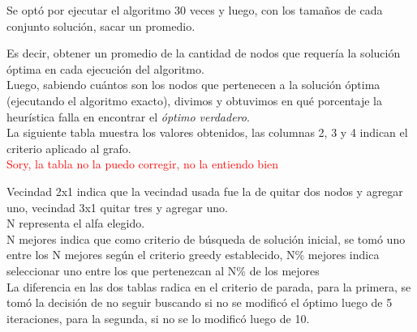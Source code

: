 \bigskip

Se opt\'o por ejecutar el algoritmo 30 veces y luego, con los tama\~nos de cada conjunto soluci\'on, sacar un promedio.

Es decir, obtener un promedio de la cantidad de nodos que requer\'ia la soluci\'on \'optima en cada ejecuci\'on del algoritmo.\\


Luego, sabiendo cu\'antos son los nodos que pertenecen a la soluci\'on \'optima (ejecutando el algoritmo exacto), divimos y obtuvimos en qu\'e porcentaje la heur\'istica falla en encontrar el \textit{\'optimo verdadero}.\\

La siguiente tabla muestra los valores obtenidos, las columnas 2, 3 y 4 indican el criterio aplicado al grafo.\\

\textcolor{red}{Sory, la tabla no la puedo corregir, no la entiendo bien}

Vecindad 2x1 indica que la vecindad usada fue la de quitar dos nodos y agregar uno, vecindad 3x1 quitar tres y agregar uno.\\

N representa el alfa elegido.\\

N mejores indica que como criterio de b\'usqueda de soluci\'on inicial, se tom\'o uno entre los N mejores seg\'un el criterio greedy establecido, N\% mejores indica seleccionar uno entre los que pertenezcan al N\% de los mejores\\

La diferencia en las dos tablas radica en el criterio de parada, para la primera, se tom\'o la decisi\'on de no seguir buscando si no se modific\'o el \'optimo luego de 5 iteraciones, para la segunda, si no se lo modific\'o luego de 10.\\

